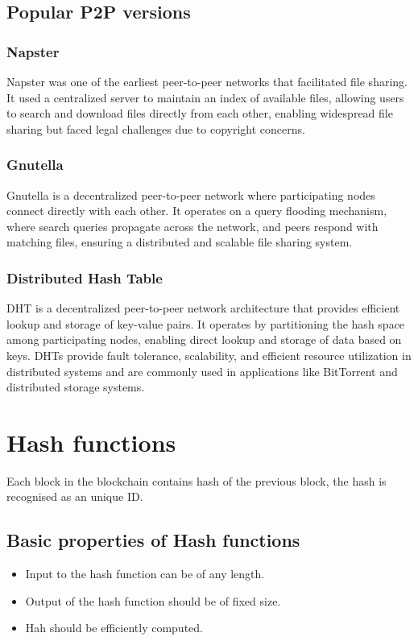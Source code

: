 \documentclass{report}
\begin{document}
\subsection{Popular P2P versions}
\subsubsection{Napster}
Napster was one of the earliest peer-to-peer networks that facilitated file sharing. It used a centralized server to maintain an index of available files, allowing users to search and download files directly from each other, enabling widespread file sharing but faced legal challenges due to copyright concerns.
\subsubsection{Gnutella}
Gnutella is a decentralized peer-to-peer network where participating nodes connect directly with each other. It operates on a query flooding mechanism, where search queries propagate across the network, and peers respond with matching files, ensuring a distributed and scalable file sharing system.
\subsubsection{Distributed Hash Table}
DHT is a decentralized peer-to-peer network architecture that provides efficient lookup and storage of key-value pairs. It operates by partitioning the hash space among participating nodes, enabling direct lookup and storage of data based on keys. DHTs provide fault tolerance, scalability, and efficient resource utilization in distributed systems and are commonly used in applications like BitTorrent and distributed storage systems.
\section{Hash functions}
Each block in the blockchain contains hash of the previous block, the hash is recognised as an unique ID.
\subsection{Basic properties of Hash functions}
\begin{itemize}
    \item Input to the hash function can be of any length.
    \item Output of the hash function should be of fixed size.
    \item Hah should be efficiently computed.
\end{itemize}
\end{document}
